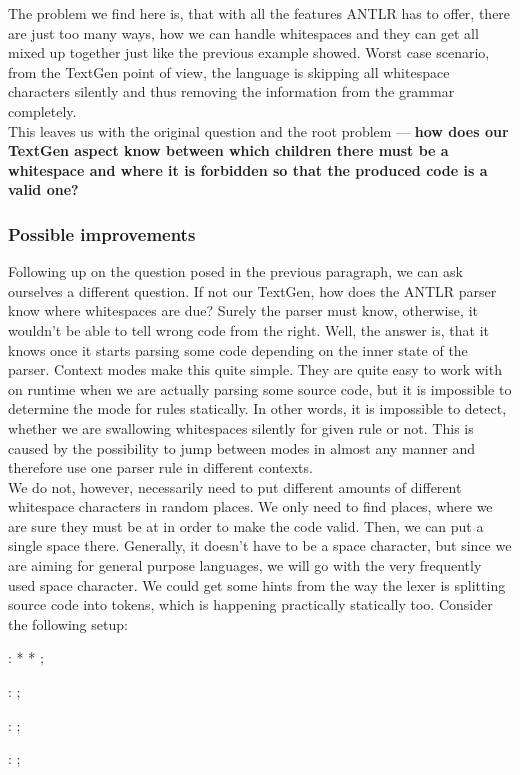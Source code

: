 The problem we find here is, that with all the features ANTLR has to offer, there are just too many ways, how we can handle whitespaces and they can get all mixed up together just like the previous example showed.
Worst case scenario, from the TextGen point of view, the language is skipping all whitespace characters silently and thus removing the information from the grammar completely.
\\

This leaves us with the original question and the root problem --- \textbf{how does our TextGen aspect know between which children there must be a whitespace and where it is forbidden so that the produced code is a valid one?}

\subsubsection{Possible improvements}

Following up on the question posed in the previous paragraph, we can ask ourselves a different question.
If not our TextGen, how does the ANTLR parser know where whitespaces are due?
Surely the parser must know, otherwise, it wouldn't be able to tell wrong code from the right.
Well, the answer is, that it knows once it starts parsing some code depending on the inner state of the parser.
Context modes make this quite simple.
They are quite easy to work with on runtime when we are actually parsing some source code, but it is impossible to determine the mode for rules statically.
In other words, it is impossible to detect, whether we are swallowing whitespaces silently for given rule or not.
This is caused by the possibility to jump between modes in almost any manner and therefore use one parser rule in different contexts.
\\

We do not, however, necessarily need to put different amounts of different whitespace characters in random places.
We only need to find places, where we are sure they must be at in order to make the code valid.
Then, we can put a single space there.
Generally, it doesn't have to be a space character, but since we are aiming for general purpose languages, we will go with the very frequently used space character.
We could get some hints from the way the lexer is splitting source code into tokens, which is happening practically statically too.
Consider the following setup:

\begin{antlr}
	    :   \literal{<}  * \literal{>} * \literal{</}  \literal{>} ;

	  :       ;

	       :    ;

	       :   \regex{~[<"]*} ;
\end{antlr}

